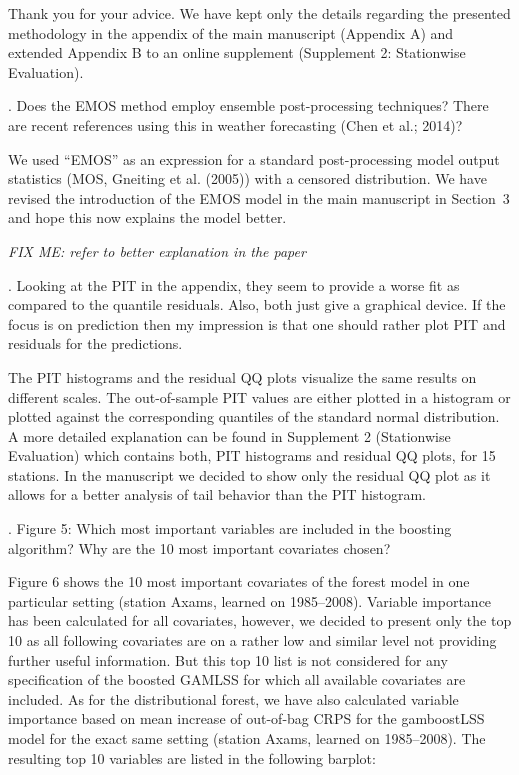 \documentclass[american,foldmarks=false,noconfig]{uibklttr}
\newenvironment{review}{\fontshape{\itdefault}\fontseries{\bfdefault} \selectfont \smallskip}{\par}
\begin{document}
Thank you for your advice. We have kept only the details regarding
the presented methodology in the appendix of the main manuscript
(Appendix A) and extended Appendix B to an online supplement
(Supplement 2: Stationwise Evaluation).

\begin{review}
2. Does the EMOS method employ ensemble post-processing 
techniques? There are recent references using this in weather 
forecasting (Chen et al.; 2014)?
\end{review}

We used ``EMOS'' as an expression for a standard post-processing
model output statistics (MOS, Gneiting et al. (2005)) with a censored 
distribution. We have revised the introduction of the EMOS model in 
the main manuscript in Section~3 and hope this now explains the model better.

\textit{FIX ME: refer to better explanation in the paper}

\begin{review}
3. Looking at the PIT in the appendix, they seem to provide a 
worse fit as compared to the quantile residuals. Also, both 
just give a graphical device. If the focus is on prediction 
then my impression is that one should rather plot PIT and 
residuals for the predictions.
\end{review}

The PIT histograms and the residual QQ plots visualize the same
results on different scales. The out-of-sample PIT values are 
either plotted in a histogram or plotted against the corresponding
quantiles of the standard normal distribution. A more detailed 
explanation can be found in Supplement 2 (Stationwise Evaluation) 
which contains both, PIT histograms and residual QQ plots, 
for 15 stations. In the manuscript we decided to show only the 
residual QQ plot as it allows for a better analysis of tail 
behavior than the PIT histogram.


\begin{review}
4. Figure 5: Which most important variables are included in the 
boosting algorithm? Why are the 10 most important covariates chosen?
\end{review}

Figure 6 shows the 10 most important covariates of the forest model
in one particular setting (station Axams, learned on 1985--2008). 
Variable importance has been calculated for all covariates, however,
we decided to present only the top 10 as all following covariates 
are on a rather low and similar level not providing further useful
information. But this top 10 list is not considered for any 
specification of the boosted GAMLSS for which all available 
covariates are included. As for the distributional forest, 
we have also calculated variable importance based on mean increase 
of out-of-bag CRPS for the gamboostLSS model for the exact same 
setting (station Axams, learned on 1985--2008). The resulting 
top 10 variables are listed in the following barplot:
\end{document}
